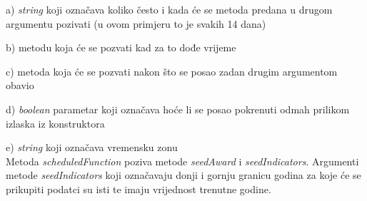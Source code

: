 \documentclass[times, utf8, zavrsni]{fer}
\begin{document}
    a) \emph{string} koji označava koliko često i kada će se metoda predana u drugom argumentu pozivati (u ovom primjeru to je svakih 14 dana)

    b) metodu koja će se pozvati kad za to dođe vrijeme

    c) metoda koja će se pozvati nakon što se posao zadan drugim argumentom obavio 

    d) \emph{boolean} parametar koji označava hoće li se posao pokrenuti odmah prilikom izlaska iz konstruktora

    e) \emph{string} koji označava vremensku zonu
\\Metoda \emph{scheduledFunction} poziva metode \emph{seedAward} i \emph{seedIndicators}. Argumenti metode \emph{seedIndicators}  
koji označavaju donji i gornju granicu godina za koje će se prikupiti podatci su isti te imaju vrijednost trenutne godine.
\end{document}
